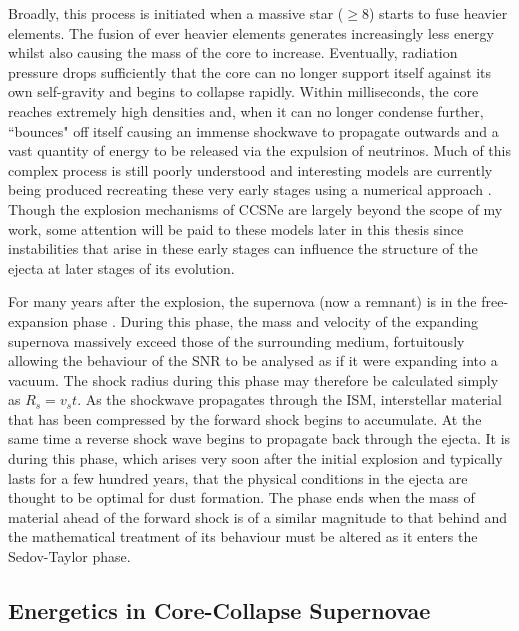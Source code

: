 Broadly, this process is initiated when a massive star ($\ge 8$\msun) starts to fuse heavier elements. The fusion of ever heavier elements generates increasingly less energy whilst also causing the mass of the core to increase.  Eventually, radiation pressure drops sufficiently that the core can no longer support itself against its own self-gravity and begins to collapse rapidly. Within milliseconds, the core reaches extremely high densities and, when it can no longer condense further, ``bounces" off itself causing  an immense shockwave to propagate outwards and a vast quantity of energy to be released via the expulsion of neutrinos.  Much of this complex process is still poorly understood and interesting models are currently being produced recreating these very early stages using a numerical approach \citep{Hammer2010,Takiwaki2014,Wongwathanarat2015}.  Though the explosion mechanisms of CCSNe are largely beyond the scope of my work, some attention will be paid to these models later in this thesis since instabilities that arise in these early stages can influence the structure of the ejecta at later stages of its evolution.

For many years after the explosion, the supernova (now a remnant) is in the free-expansion phase \citep{Landau1959,Ostriker1988}. During this phase, the mass and velocity of the expanding supernova massively exceed those of the surrounding medium, fortuitously allowing the behaviour of the SNR to be analysed as if it were expanding into a vacuum.  The shock radius during this phase may therefore be calculated simply as $R_s = v_s t$.  As the shockwave propagates through the ISM, interstellar material that has been compressed by the forward shock begins to accumulate.  At the same time a reverse shock wave begins to propagate back through the ejecta.  It is during this phase, which arises very soon after the initial explosion and typically lasts for a few hundred years, that the physical conditions in the ejecta are thought to be optimal for dust formation.  The phase ends when the mass of material ahead of the forward shock is of a similar magnitude to that behind and the mathematical treatment of its behaviour must be altered as it enters the Sedov-Taylor phase.
 

 
 \subsection{Energetics in Core-Collapse Supernovae}

